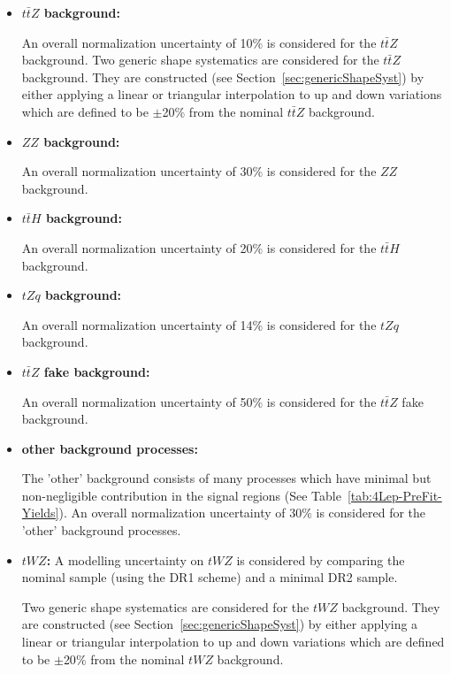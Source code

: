 \begin{itemize}
\item \textbf{$t\bar{t}Z$ background:}

An overall normalization uncertainty of 10$\%$ is considered for the $t\bar{t}Z$ background. Two generic shape systematics are considered for the $t\bar{t}Z$ background. They are constructed (see Section~\ref{sec:genericShapeSyst}) by either applying a linear or triangular interpolation to up and down variations which are defined to be $\pm$20$\%$ from the nominal $t\bar{t}Z$ background.

\item \textbf{$ZZ$ background:}

An overall normalization uncertainty of 30$\%$ is considered for the $ZZ$ background.

\item \textbf{$t\bar{t}H$ background:}

An overall normalization uncertainty of 20$\%$ is considered for the $t\bar{t}H$ background.



\item \textbf{$tZq$ background:}

An overall normalization uncertainty of 14$\%$ is considered for the $tZq$ background.


\item \textbf{$t\bar{t}Z$ fake background:}

An overall normalization uncertainty of 50$\%$ is considered for the $t\bar{t}Z$ fake background.


\item \textbf{other background processes:}

The 'other' background consists of many processes which have minimal but non-negligible contribution in the signal regions (See Table~\ref{tab:4Lep-PreFit-Yields}). An overall normalization uncertainty of 30$\%$ is considered for the 'other' background processes.


\item \textbf{$tWZ$:}
A modelling uncertainty on $tWZ$ is considered by comparing the nominal sample (using the DR1 scheme) and a minimal DR2 sample.

Two generic shape systematics are considered for the $tWZ$ background. They are constructed (see Section~\ref{sec:genericShapeSyst}) by either applying a linear or triangular interpolation to up and down variations which are defined to be $\pm$20$\%$ from the nominal $tWZ$ background.

\end{itemize}

